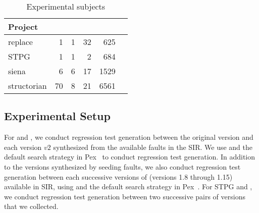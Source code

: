 \setlength{\tabcolsep}{6pt}
\begin{table}
\begin{CodeOut}
\begin{center}
\caption {\label{table:subjects}Experimental subjects}
\begin {tabular} {|l|r|r|r|r|r|}
\hline
Project&\CenterCell{Classes}&\CenterCell{Classes Covered}&\CenterCell{Versions}&\CenterCell{LOC}\\

\hline
\hline replace &1&1&32&625\\
\hline STPG &1&1&2&684\\
\hline siena &6&6&17&1529\\
\hline structorian &70&8&21&6561\\
\hline
\end{tabular}
\end{center}
\end{CodeOut}
\vspace{- 0.3 in}
\end{table}



\subsection{Experimental Setup}

For  and , we conduct regression test generation between the original version and each version $v2$ synthesized from the available faults in the SIR. We use  and the default search strategy in Pex~\cite{Pex, fitnex} to conduct regression test generation. In addition to the versions synthesized by seeding faults, we also conduct regression test generation between each successive versions of  (versions 1.8 through 1.15) available in SIR, using  and the default search strategy in Pex~\cite{Pex, fitnex}. For STPG and , we conduct regression test generation between two successive pairs of versions that we collected. 

